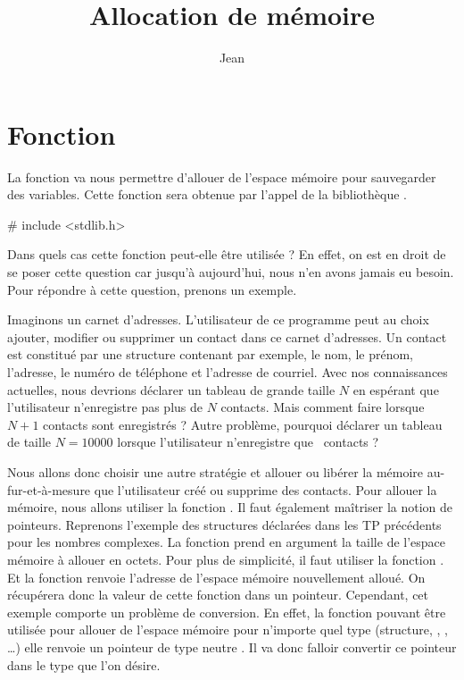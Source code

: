 \documentclass[a4paper]{article}
\title{Allocation de mémoire}
\author{Jean \Nom{Simard}}
\date{\Date[l]{04}{11}{2008}}
\begin{document}
	\maketitle
	\section{Fonction }
		La fonction  va nous permettre d'allouer de l'espace mémoire pour sauvegarder des variables.
		Cette fonction sera obtenue par l'appel de la bibliothèque .
		\begin{Code*}
# include <stdlib.h>
		\end{Code*}
		Dans quels cas cette fonction peut-elle être utilisée ?
		En effet, on est en droit de se poser cette question car jusqu'à aujourd'hui, nous n'en avons jamais eu besoin.
		Pour répondre à cette question, prenons un exemple.

		Imaginons un carnet d'adresses.
		L'utilisateur de ce programme peut au choix ajouter, modifier ou supprimer un contact dans ce carnet d'adresses.
		Un contact est constitué par une structure contenant par exemple, le nom, le prénom, l'adresse, le numéro de téléphone et l'adresse de courriel.
		Avec nos connaissances actuelles, nous devrions déclarer un tableau de grande taille $N$ en espérant que l'utilisateur n'enregistre pas plus de $N$ contacts.
		Mais comment faire lorsque $N+1$ contacts sont enregistrés ?
		Autre problème, pourquoi déclarer un tableau de taille $N=10000$ lorsque l'utilisateur n'enregistre que ~contacts ?

		Nous allons donc choisir une autre stratégie et allouer ou libérer la mémoire au-fur-et-à-mesure que l'utilisateur créé ou supprime des contacts.
		Pour allouer la mémoire, nous allons utiliser la fonction .
		Il faut également maîtriser la notion de pointeurs.
		Reprenons l'exemple des structures déclarées dans les TP précédents pour les nombres complexes.
		La fonction  prend en argument la taille de l'espace mémoire à allouer en octets.
		Pour plus de simplicité, il faut utiliser la fonction .
		Et la fonction  renvoie l'adresse de l'espace mémoire nouvellement alloué.
		On récupérera donc la valeur de cette fonction dans un pointeur.
		Cependant, cet exemple comporte un problème de conversion.
		En effet, la fonction  pouvant être utilisée pour allouer de l'espace mémoire pour n'importe quel type (structure, , , \dots{}) elle renvoie un pointeur de type neutre .
		Il va donc falloir convertir ce pointeur dans le type que l'on désire.
		
\end{document}
